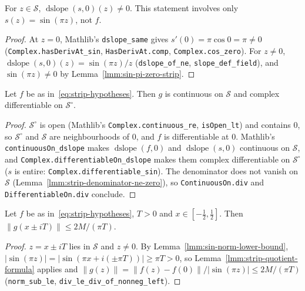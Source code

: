 \begin{lemma}
    \label{lmm:strip-denominator-ne-zero}
    \leanok
    For $z \in \mathcal{S}$, $\operatorname{dslope}(s, 0)(z) \ne 0$. This statement involves only $s(z) = \sin(\pi z)$, not $f$.
\end{lemma}
\begin{proof}
    \leanok
    At $z = 0$, Mathlib's \texttt{dslope\_same} gives $s'(0) = \pi\cos 0 = \pi \ne 0$ (\texttt{Complex.hasDerivAt\_sin}, \texttt{HasDerivAt.comp}, \texttt{Complex.cos\_zero}). For $z \ne 0$, $\operatorname{dslope}(s, 0)(z) = \sin(\pi z)/z$ (\texttt{dslope\_of\_ne}, \texttt{slope\_def\_field}), and $\sin(\pi z) \ne 0$ by Lemma~\ref{lmm:sin-pi-zero-strip}.
\end{proof}

\begin{lemma}
    \label{lmm:strip-quotient-regular}
    \leanok
    Let $f$ be as in~\eqref{eq:strip-hypotheses}. Then $g$ is continuous on $\mathcal{S}$ and complex differentiable on $\mathcal{S}^\circ$.
\end{lemma}
\begin{proof}
    \leanok
    $\mathcal{S}^\circ$ is open (Mathlib's \texttt{Complex.continuous\_re}, \texttt{isOpen\_lt}) and contains $0$, so $\mathcal{S}^\circ$ and $\mathcal{S}$ are neighbourhoods of $0$, and $f$ is differentiable at $0$. Mathlib's \texttt{continuousOn\_dslope} makes $\operatorname{dslope}(f, 0)$ and $\operatorname{dslope}(s, 0)$ continuous on $\mathcal{S}$, and \texttt{Complex.differentiableOn\_dslope} makes them complex differentiable on $\mathcal{S}^\circ$ ($s$ is entire: \texttt{Complex.differentiable\_sin}). The denominator does not vanish on $\mathcal{S}$ (Lemma~\ref{lmm:strip-denominator-ne-zero}), so \texttt{ContinuousOn.div} and \texttt{DifferentiableOn.div} conclude.
\end{proof}

\begin{lemma}
    \label{lmm:strip-quotient-horizontal-bound}
    \leanok
    Let $f$ be as in~\eqref{eq:strip-hypotheses}, $T > 0$ and $x \in [-\tfrac{1}{2}, \tfrac{1}{2}]$. Then $\|g(x \pm iT)\| \le 2M/(\pi T)$.
\end{lemma}
\begin{proof}
    \leanok
    $z = x \pm iT$ lies in $\mathcal{S}$ and $z \ne 0$. By Lemma~\ref{lmm:sin-norm-lower-bound}, $|\sin(\pi z)| = |\sin(\pi x + i(\pm\pi T))| \ge \pi T > 0$, so Lemma~\ref{lmm:strip-quotient-formula} applies and $\|g(z)\| = \|f(z) - f(0)\|/|\sin(\pi z)| \le 2M/(\pi T)$ (\texttt{norm\_sub\_le}, \texttt{div\_le\_div\_of\_nonneg\_left}).
\end{proof}

